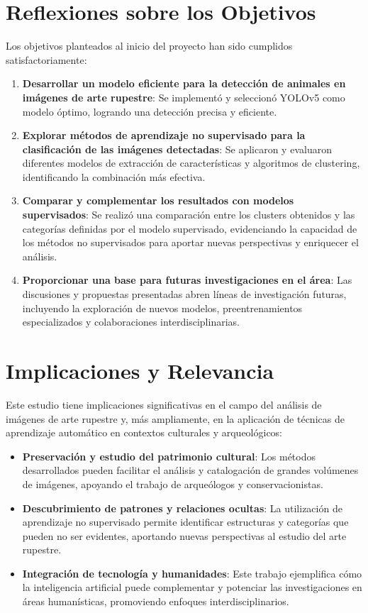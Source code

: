 \section{Reflexiones sobre los Objetivos}

Los objetivos planteados al inicio del proyecto han sido cumplidos satisfactoriamente:

\begin{enumerate}
    \item \textbf{Desarrollar un modelo eficiente para la detección de animales en imágenes de arte rupestre}: Se implementó y seleccionó YOLOv5 como modelo óptimo, logrando una detección precisa y eficiente.
    \item \textbf{Explorar métodos de aprendizaje no supervisado para la clasificación de las imágenes detectadas}: Se aplicaron y evaluaron diferentes modelos de extracción de características y algoritmos de clustering, identificando la combinación más efectiva.
    \item \textbf{Comparar y complementar los resultados con modelos supervisados}: Se realizó una comparación entre los clusters obtenidos y las categorías definidas por el modelo supervisado, evidenciando la capacidad de los métodos no supervisados para aportar nuevas perspectivas y enriquecer el análisis.
    \item \textbf{Proporcionar una base para futuras investigaciones en el área}: Las discusiones y propuestas presentadas abren líneas de investigación futuras, incluyendo la exploración de nuevos modelos, preentrenamientos especializados y colaboraciones interdisciplinarias.
\end{enumerate}

\section{Implicaciones y Relevancia}

Este estudio tiene implicaciones significativas en el campo del análisis de imágenes de arte rupestre y, más ampliamente, en la aplicación de técnicas de aprendizaje automático en contextos culturales y arqueológicos:

\begin{itemize}
    \item \textbf{Preservación y estudio del patrimonio cultural}: Los métodos desarrollados pueden facilitar el análisis y catalogación de grandes volúmenes de imágenes, apoyando el trabajo de arqueólogos y conservacionistas.
    \item \textbf{Descubrimiento de patrones y relaciones ocultas}: La utilización de aprendizaje no supervisado permite identificar estructuras y categorías que pueden no ser evidentes, aportando nuevas perspectivas al estudio del arte rupestre.
    \item \textbf{Integración de tecnología y humanidades}: Este trabajo ejemplifica cómo la inteligencia artificial puede complementar y potenciar las investigaciones en áreas humanísticas, promoviendo enfoques interdisciplinarios.
\end{itemize}

